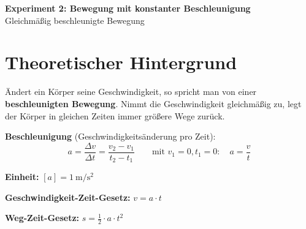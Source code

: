 \documentclass[11pt,a4paper]{scrartcl}
\begin{document}
	
	\begin{center}
		{\LARGE\bfseries Experiment 2: Bewegung mit konstanter Beschleunigung}\\[0.3cm]
		{\large Gleichmäßig beschleunigte Bewegung}
	\end{center}
	
	\vspace{0.3cm}
	
	\section*{Theoretischer Hintergrund}
	
	Ändert ein Körper seine Geschwindigkeit, so spricht man von einer \textbf{beschleunigten Bewegung}. Nimmt die Geschwindigkeit gleichmäßig zu, legt der Körper in gleichen Zeiten immer größere Wege zurück.
	
	\begin{formelbox}[title={\faIcon{square-root-alt} Beschleunigung und Bewegungsgleichungen}]
		\textbf{Beschleunigung} (Geschwindigkeitsänderung pro Zeit):
		\[a = \frac{\Delta v}{\Delta t} = \frac{v_2 - v_1}{t_2 - t_1} \qquad \text{mit } v_1 = 0, t_1 = 0: \quad a = \frac{v}{t}\]
		
		\textbf{Einheit:} $[a] = \SI{1}{\metre\per\second\squared}$
		
		\vspace{0.3cm}
		\textbf{Geschwindigkeit-Zeit-Gesetz:} \quad $v = a \cdot t$
		
		\textbf{Weg-Zeit-Gesetz:} \quad $s = \frac{1}{2} \cdot a \cdot t^2$
	\end{formelbox}
	
	\vspace{0.2cm}
	
\end{document}
